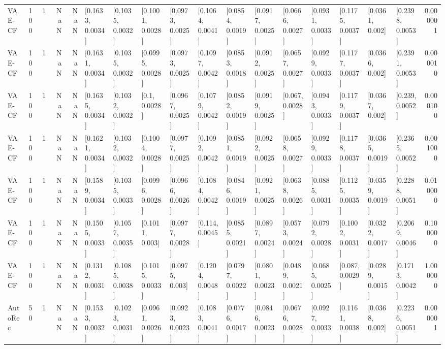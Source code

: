 \begin{tabular}{lllrrllllllllllllr}
  VAE-CF &  100 &     1 &   NaN &   NaN &  [0.1633, 0.0034] &  [0.1035, 0.0032] &  [0.1001, 0.0028] &  [0.0973, 0.0025] &  [0.1064, 0.0041] &  [0.0854, 0.0019] &  [0.0917, 0.0025] &  [0.0666, 0.0027] &  [0.0931, 0.0033] &  [0.1175, 0.0037] &   [0.0361, 0.002] &  [0.2398, 0.0053] &  0.000001 \\
  VAE-CF &  100 &     1 &   NaN &   NaN &  [0.1631, 0.0034] &  [0.1035, 0.0032] &  [0.0995, 0.0028] &  [0.0973, 0.0025] &  [0.1097, 0.0042] &  [0.0853, 0.0018] &  [0.0912, 0.0025] &  [0.0657, 0.0027] &  [0.0929, 0.0033] &  [0.1177, 0.0037] &   [0.0366, 0.002] &  [0.2391, 0.0053] &  0.000010 \\
  VAE-CF &  100 &     1 &   NaN &   NaN &  [0.1635, 0.0034] &  [0.1032, 0.0032] &     [0.1, 0.0028] &  [0.0967, 0.0025] &  [0.1079, 0.0042] &  [0.0852, 0.0019] &  [0.0919, 0.0025] &   [0.067, 0.0028] &  [0.0943, 0.0033] &  [0.1179, 0.0037] &   [0.0367, 0.002] &   [0.239, 0.0052] &  0.000100 \\
  VAE-CF &  100 &     1 &   NaN &   NaN &  [0.1621, 0.0034] &  [0.1032, 0.0032] &  [0.1004, 0.0028] &  [0.0977, 0.0025] &  [0.1092, 0.0042] &  [0.0851, 0.0019] &  [0.0922, 0.0025] &  [0.0658, 0.0027] &  [0.0929, 0.0033] &  [0.1178, 0.0037] &  [0.0365, 0.0019] &  [0.2365, 0.0052] &  0.001000 \\
  VAE-CF &  100 &     1 &   NaN &   NaN &  [0.1589, 0.0034] &  [0.1035, 0.0033] &  [0.0996, 0.0028] &  [0.0966, 0.0026] &  [0.1084, 0.0042] &  [0.0846, 0.0019] &  [0.0921, 0.0025] &  [0.0638, 0.0026] &  [0.0885, 0.0031] &  [0.1125, 0.0035] &  [0.0359, 0.0019] &  [0.2288, 0.0051] &  0.010000 \\
  VAE-CF &  100 &     1 &   NaN &   NaN &  [0.1505, 0.0033] &  [0.1057, 0.0035] &   [0.1011, 0.003] &  [0.0977, 0.0028] &   [0.114, 0.0045] &  [0.0855, 0.0021] &  [0.0897, 0.0024] &  [0.0573, 0.0024] &  [0.0792, 0.0028] &  [0.1002, 0.0031] &  [0.0322, 0.0017] &  [0.2069, 0.0046] &  0.100000 \\
  VAE-CF &  100 &     1 &   NaN &   NaN &  [0.1312, 0.0031] &  [0.1085, 0.0038] &  [0.1015, 0.0033] &   [0.0975, 0.003] &  [0.1204, 0.0048] &  [0.0797, 0.0022] &  [0.0801, 0.0023] &  [0.0489, 0.0021] &  [0.0685, 0.0025] &   [0.087, 0.0029] &  [0.0289, 0.0015] &  [0.1713, 0.0042] &  1.000000 \\
 AutoRec &   50 &     1 &   NaN &   NaN &  [0.1533, 0.0032] &  [0.1023, 0.0031] &  [0.0961, 0.0026] &  [0.0923, 0.0023] &  [0.1083, 0.0041] &  [0.0776, 0.0017] &  [0.0846, 0.0023] &  [0.0676, 0.0028] &  [0.0927, 0.0033] &  [0.1161, 0.0038] &   [0.0368, 0.002] &  [0.2236, 0.0051] &  0.000001 \\

\end{tabular}
